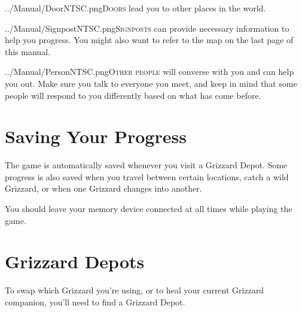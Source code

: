 \documentclass[10pt,twocolumn,openany,article]{memoir}
\newcommand\TV{NTSC}
\newcommand\TV{PAL}
\newcommand\TV{SECAM}
\begin{document}
\lettrine[image=true,                lines=5,               findent=3pt,
nindent=3pt]{../Manual/Door\TV.png}{Doors} lead  you to other  places in
the world.

\vspace{16pt}

\lettrine[image=true,                lines=5,               findent=3pt,
nindent=3pt]{../Manual/Signpost\TV.png}{Signposts} can provide necessary
information to  help you progress. You  might also want to  refer to the
map on the last page of this manual.


\lettrine[image=true,                lines=5,               findent=3pt,
nindent=3pt]{../Manual/Person\TV.png}{Other  people} will  converse with
you and can help  you out. Make sure you talk to  everyone you meet, and
keep in mind  that some people will respond to  you differently based on
what has come before.



\ifdefined\NOSAVE\else

\section{Saving Your Progress}

The game  is automatically  saved whenever you  visit a  Grizzard Depot.
Some progress is  also saved when you travel  between certain locations,
catch a wild Grizzard, or when one Grizzard changes into another.

\ifdefined\ATARIAGESAVE\else

You should leave your memory device connected at all times while playing
the game.

\fi \fi

\section{Grizzard Depots}\label{sec:GrizzardDepot}

To \ifdefined\NOSAVE\else  swap which  Grizzard you're using,  or to  \fi heal
your current Grizzard companion, you'll need to find a Grizzard Depot.
\end{document}
